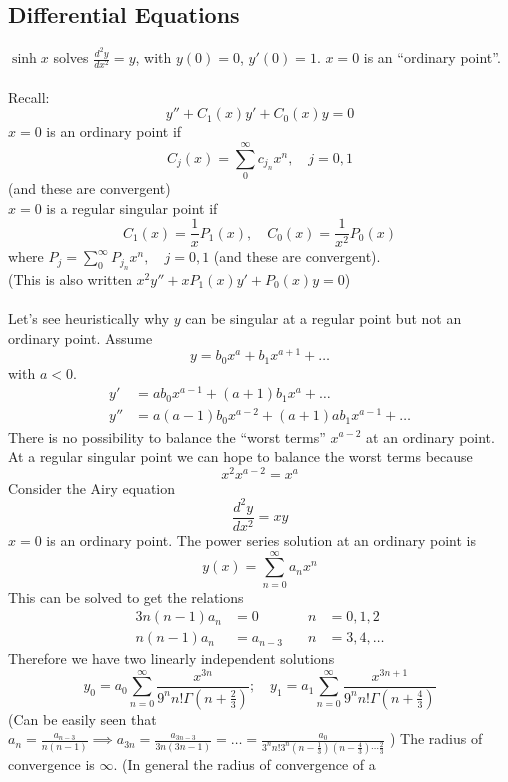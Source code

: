 \documentclass{article}
\begin{document}
\subsection*{Differential Equations}
$\sinh x$ solves $\displaystyle \frac{d^2y}{dx^2} = y$, with $y(0)=0$, 
$y'(0)=1$. $x=0$ is an ``ordinary point''.
\\
\\
Recall:
\[ y'' + C_1(x) y' + C_0(x) y =0 \]
$x=0$ is an ordinary point if
\[ C_j(x) = \sum_0^{\infty} c_{j_n}x^n, \quad j = 0,1\]
(and these are convergent)
\\
$x=0$ is a regular singular point if 
\[ C_1(x) = \frac{1}{x} P_1(x), \quad C_0(x) = \frac{1}{x^2}P_0(x) \]
where $\displaystyle P_j = \sum_0^{\infty} P_{j_n} x^n, \quad j=0,1$
(and these are convergent).
\\
(This is also written $x^2 y'' + xP_1(x) y' + P_0(x)y =0$)
\\
\\
Let's see heuristically why $y$ can be singular at a regular point but
not an ordinary point. Assume
\[ y = b_0 x^a + b_1 x^{a+1} + \dots \]
with $a<0$.
\begin{align*}
 y' &= ab_0 x^{a-1} + (a+1)b_1 x^{a} + \dots \\
 y'' &= a(a-1)b_0 x^{a-2} + (a+1)ab_1 x^{a-1} + \dots 
\end{align*}
There is no possibility to balance the ``worst terms'' $x^{a-2}$ at
an ordinary point. At a regular singular point we can hope to balance the 
worst terms because
\[ x^2 x^{a-2} = x^a \]
Consider the Airy equation
\begin{equation}\tag{A}
\frac{d^2 y}{dx^2} = xy
\end{equation}
$x=0$ is an ordinary point. The power series solution at an ordinary point is
\[ y(x) = \sum_{n=0}^{\infty} a_n x^n \]
This can be solved to get the relations
\begin{alignat*}{3}
n(n-1)a_n &=0 \quad  &n &= 0,1,2 \\
n(n-1)a_n &= a_{n-3} \quad &n &= 3,4,\dots
\end{alignat*}
Therefore we have two linearly independent solutions
\[ y_0 = a_0 \sum_{n=0}^{\infty}\frac{x^{3n}}{9^n n! \Gamma(n + \frac{2}{3})} ; \quad
y_1 = a_1 \sum_{n=0}^{\infty}\frac{x^{3n+1}}{9^n n! \Gamma(n + \frac{4}{3})} \]
(Can be easily seen that $\displaystyle a_n = \frac{a_{n-3}}{n(n-1)} \implies a_{3n} =
\frac{a_{3n-3}}{3n(3n-1)}= \dots = \frac{a_0}{3^n n! 3^n (n-\frac{1}{3})
(n-\frac{4}{3}) \cdots \frac{2}{3}} $ )
The radius of convergence is $\infty$. (In general the radius of convergence of a
\end{document}
